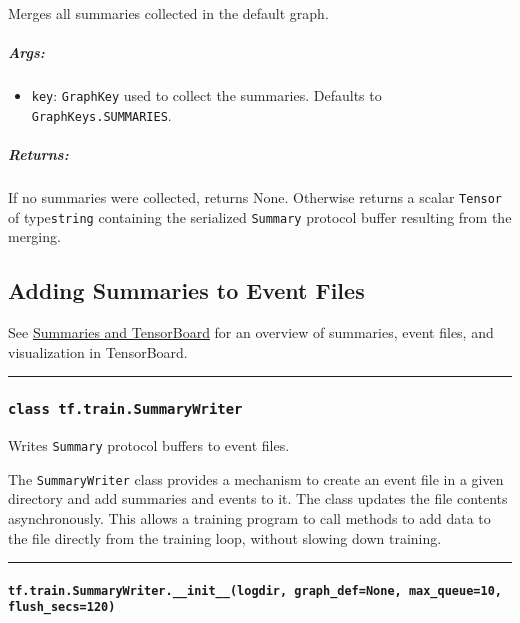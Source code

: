 Merges all summaries collected in the default graph.

\subparagraph{Args: }\label{args-35}

\begin{itemize}
\tightlist
\item
  \texttt{key}: \texttt{GraphKey} used to collect the summaries.
  Defaults to \texttt{GraphKeys.SUMMARIES}.
\end{itemize}

\subparagraph{Returns: }\label{returns-26}

If no summaries were collected, returns None. Otherwise returns a scalar
\texttt{Tensor} of type\texttt{string} containing the serialized
\texttt{Summary} protocol buffer resulting from the merging.

\subsection{Adding Summaries to Event Files
}\label{adding-summaries-to-event-files}

See \href{../../how_tos/summaries_and_tensorboard/index.md}{Summaries
and TensorBoard} for an overview of summaries, event files, and
visualization in TensorBoard.

\begin{center}\rule{0.5\linewidth}{\linethickness}\end{center}

\subsubsection{\texorpdfstring{\texttt{class\ tf.train.SummaryWriter}
}{class tf.train.SummaryWriter }}\label{class-tf.train.summarywriter}

Writes \texttt{Summary} protocol buffers to event files.

The \texttt{SummaryWriter} class provides a mechanism to create an event
file in a given directory and add summaries and events to it. The class
updates the file contents asynchronously. This allows a training program
to call methods to add data to the file directly from the training loop,
without slowing down training.

\begin{center}\rule{0.5\linewidth}{\linethickness}\end{center}

\paragraph{\texorpdfstring{\texttt{tf.train.SummaryWriter.\_\_init\_\_(logdir,\ graph\_def=None,\ max\_queue=10,\ flush\_secs=120)}
}{tf.train.SummaryWriter.\_\_init\_\_(logdir, graph\_def=None, max\_queue=10, flush\_secs=120) }}\label{tf.train.summarywriter.ux5fux5finitux5fux5flogdir-graphux5fdefnone-maxux5fqueue10-flushux5fsecs120}

